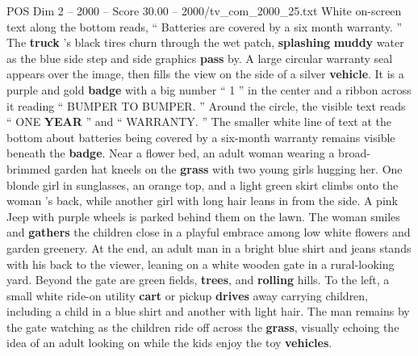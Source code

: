 \begin{textsample}{POS Dim 2 – 2000 – Score 30.00 – 2000/tv\_com\_2000\_25.txt}
White on-screen text along the bottom reads, “ Batteries are covered by a six month warranty. ” The \textbf{truck} ’s black tires churn through the wet patch, \textbf{splashing} \textbf{muddy} water as the blue side step and side graphics \textbf{pass} by.
A large circular warranty seal appears over the image, then fills the view on the side of a silver \textbf{vehicle}.
It is a purple and gold \textbf{badge} with a big number “ 1 ” in the center and a ribbon across it reading “ BUMPER TO BUMPER. ” Around the circle, the visible text reads “ ONE \textbf{YEAR} ” and “ WARRANTY. ” The smaller white line of text at the bottom about batteries being covered by a six-month warranty remains visible beneath the \textbf{badge}.
Near a flower bed, an adult woman wearing a broad-brimmed garden hat kneels on the \textbf{grass} with two young girls hugging her.
One blonde girl in sunglasses, an orange top, and a light green skirt climbs onto the woman ’s back, while another girl with long hair leans in from the side.
A pink Jeep with purple wheels is parked behind them on the lawn.
The woman smiles and \textbf{gathers} the children close in a playful embrace among low white flowers and garden greenery.
At the end, an adult man in a bright blue shirt and jeans stands with his back to the viewer, leaning on a white wooden gate in a rural-looking yard.
Beyond the gate are green fields, \textbf{trees}, and \textbf{rolling} hills.
To the left, a small white ride-on utility \textbf{cart} or pickup \textbf{drives} away carrying children, including a child in a blue shirt and another with light hair.
The man remains by the gate watching as the children ride off across the \textbf{grass}, visually echoing the idea of an adult looking on while the kids enjoy the toy \textbf{vehicles}.

\end{textsample}
